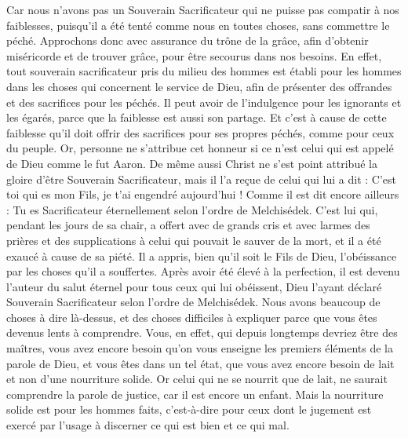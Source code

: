 \begin{multicols}{2}
Car nous n'avons pas un Souverain Sacrificateur qui ne puisse pas compatir à nos faiblesses, puisqu’il a été tenté comme nous en toutes choses, sans commettre le péché.
Approchons donc avec assurance du trône de la grâce, afin d’obtenir miséricorde et de trouver grâce, pour être secourus dans nos besoins.
\VerseOne{}En effet, tout souverain sacrificateur pris du milieu des hommes est établi pour les hommes dans les choses qui concernent le service de Dieu, afin de présenter des offrandes et des sacrifices pour les péchés.
Il peut avoir de l’indulgence pour les ignorants et les égarés, parce que la faiblesse est aussi son partage.
Et c’est à cause de cette faiblesse qu’il doit offrir des sacrifices pour ses propres péchés, comme pour ceux du peuple.
Or, personne ne s'attribue cet honneur si ce n’est celui qui est appelé de Dieu comme le fut Aaron.
De même aussi Christ ne s'est point attribué la gloire d’être Souverain Sacrificateur, mais il l’a reçue de celui qui lui a dit : C’est toi qui es mon Fils, je t'ai engendré aujourd'hui !
Comme il est dit encore ailleurs : Tu es Sacrificateur éternellement selon l'ordre de Melchisédek.
C’est lui qui, pendant les jours de sa chair, a offert avec de grands cris et avec larmes des prières et des supplications à celui qui pouvait le sauver de la mort, et il a été exaucé à cause de sa piété.
Il a appris, bien qu’il soit le Fils de Dieu, l'obéissance par les choses qu'il a souffertes.
Après avoir été élevé à la perfection, il est devenu l'auteur du salut éternel pour tous ceux qui lui obéissent,
Dieu l’ayant déclaré Souverain Sacrificateur selon l'ordre de Melchisédek.
Nous avons beaucoup de choses à dire là-dessus, et des choses difficiles à expliquer parce que vous êtes devenus lents à comprendre.
Vous, en effet, qui depuis longtemps devriez être des maîtres, vous avez encore besoin qu'on vous enseigne les premiers éléments de la parole de Dieu, et vous êtes dans un tel état, que vous avez encore besoin de lait et non d’une nourriture solide.
Or celui qui ne se nourrit que de lait, ne saurait comprendre la parole de justice, car il est encore un enfant.
Mais la nourriture solide est pour les hommes faits, c'est-à-dire pour ceux dont le jugement est exercé par l’usage à discerner ce qui est bien et ce qui mal.

\end{multicols}
